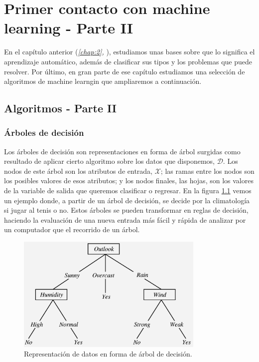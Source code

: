 \chapter{Primer contacto con machine learning - Parte II} \label{chap:3}

\vspace*{5mm}

En el capítulo anterior (\emph{\ref{chap:2}, }), estudiamos unas bases sobre que lo significa el aprendizaje automático, además de clasificar sus tipos y los problemas que puede resolver. Por último, en gran parte de ese capítulo estudiamos una selección de algoritmos de machine learngin que ampliaremos a continuación.

\section{Algoritmos - Parte II} \label{sec:3.1}

\subsection{Árboles de decisión} \label{subsec:3.1.1}

Los árboles de decisión son representaciones en forma de árbol surgidas como resultado de aplicar cierto algoritmo sobre los datos que disponemos, $\mathcal{D}$. Los nodos de este árbol son los atributos de entrada, $\mathcal{X}$; las ramas entre los nodos son los posibles valores de esos atributos; y los nodos finales, las hojas, son los valores de la variable de salida que queremos clasificar o regresar. En la figura \ref{fig:3.1} vemos un ejemplo donde, a partir de un árbol de decisión, se decide por la climatología si jugar al tenis o no. Estos árboles se pueden transformar en reglas de decisión, haciendo la evaluación de una nueva entrada más fácil y rápida de analizar por un computador que el recorrido de un árbol.

\begin{figure}[ht]
  \centering
  \includegraphics[width=90mm]{figures/ch_03/decision_tree_example.png}
  \caption{Representación de datos en forma de árbol de decisión. \cite{vidal2009decision}}
  \label{fig:3.1}
\end{figure}


